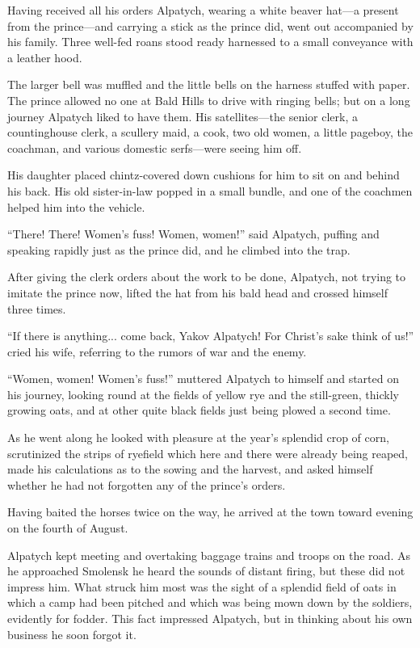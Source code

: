 Having received all his orders Alpatych, wearing a white beaver
hat---a present from the prince---and carrying a stick as the
prince did, went out accompanied by his family. Three well-fed
roans stood ready harnessed to a small conveyance with a leather
hood.

The larger bell was muffled and the little bells on the harness
stuffed with paper. The prince allowed no one at Bald Hills to
drive with ringing bells; but on a long journey Alpatych liked to
have them. His satellites---the senior clerk, a countinghouse
clerk, a scullery maid, a cook, two old women, a little pageboy,
the coachman, and various domestic serfs---were seeing him off.

His daughter placed chintz-covered down cushions for him to sit
on and behind his back. His old sister-in-law popped in a small
bundle, and one of the coachmen helped him into the vehicle.

``There! There! Women's fuss! Women, women!'' said Alpatych,
puffing and speaking rapidly just as the prince did, and he
climbed into the trap.

After giving the clerk orders about the work to be done,
Alpatych, not trying to imitate the prince now, lifted the hat
from his bald head and crossed himself three times.

``If there is anything... come back, Yakov Alpatych! For Christ's
sake think of us!'' cried his wife, referring to the rumors of
war and the enemy.

``Women, women! Women's fuss!'' muttered Alpatych to himself and
started on his journey, looking round at the fields of yellow rye
and the still-green, thickly growing oats, and at other quite
black fields just being plowed a second time.

As he went along he looked with pleasure at the year's splendid
crop of corn, scrutinized the strips of ryefield which here and
there were already being reaped, made his calculations as to the
sowing and the harvest, and asked himself whether he had not
forgotten any of the prince's orders.

Having baited the horses twice on the way, he arrived at the town
toward evening on the fourth of August.

Alpatych kept meeting and overtaking baggage trains and troops on
the road. As he approached Smolensk he heard the sounds of
distant firing, but these did not impress him. What struck him
most was the sight of a splendid field of oats in which a camp
had been pitched and which was being mown down by the soldiers,
evidently for fodder. This fact impressed Alpatych, but in
thinking about his own business he soon forgot it.

